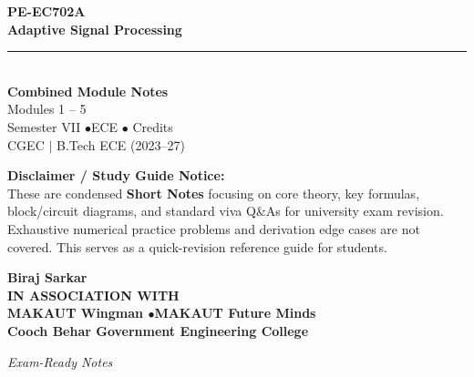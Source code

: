 \documentclass[12pt,a4paper]{article}
\begin{document}
\thispagestyle{empty}


\vspace*{1.0cm}
\begin{center}
  {\Huge\bfseries\color{myred} PE-EC702A}\\[10pt]
  {\LARGE\bfseries\color{mydark} Adaptive Signal Processing}\\[20pt]
  {\color{myred}\rule{0.7\linewidth}{1.5pt}}\\[18pt]
  {\Large\color{myteal}\textbf{Combined Module Notes}}\\[8pt]
  {\large\color{mydark} Modules 1 -- 5}\\[40pt]
  {\normalsize\color{mydark} Semester VII \quad$\bullet$\quad ECE \quad$\bullet$ Credits}\\[12pt]
  {\normalsize\color{mydark} CGEC \;$|$\; B.Tech ECE (2023--27)}
\end{center}
\vspace{1.0cm}
\begin{center}
  \begin{tcolorbox}[colback=mygray, colframe=mgframe, boxrule=0.5pt, arc=3pt, width=0.85\linewidth]
    \centering\small\color{mydark}
    \textbf{Disclaimer / Study Guide Notice:}\\
    These are condensed \textbf{Short Notes} focusing on core theory, key formulas, block/circuit diagrams, and standard viva Q\&As for university exam revision. Exhaustive numerical practice problems and derivation edge cases are not covered. This serves as a quick-revision reference guide for students.
  \end{tcolorbox}
\end{center}
\vfill
\vspace{0.6cm}
\begin{center}
  {\large\bfseries\color{mypurple} Biraj Sarkar}\\[16pt]
  {\footnotesize\color{watermark}\textbf{IN ASSOCIATION WITH}}\\[8pt]
  {\small\bfseries\color{mydark} MAKAUT Wingman \quad$\bullet$\quad MAKAUT Future Minds}\\[12pt]
  {\large\bfseries\color{myteal} Cooch Behar Government Engineering College}
\end{center}
\vfill
\begin{center}{\small\color{watermark}\textit{Exam-Ready Notes}}\end{center}
\clearpage
\end{document}
